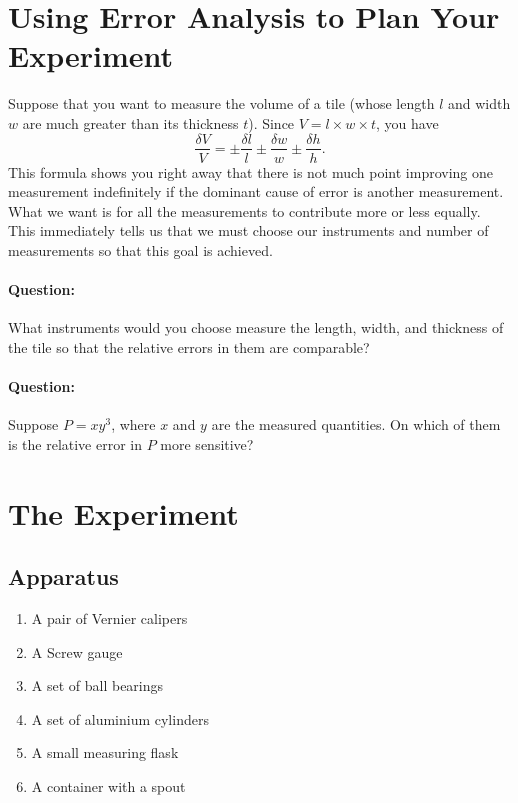 \section{Using Error Analysis to Plan Your Experiment}

Suppose that you want to measure the volume of a tile (whose length $l$ and width $w$ are much greater than its thickness $t$). Since $V = l \times w \times t$, you have
\begin{equation*}
    \frac{\delta V}{V} = \pm \frac{\delta l}{l} \pm \frac{\delta w}{w} \pm \frac{\delta h}{h}.
\end{equation*}
This formula shows you right away that there is not much point improving one measurement indefinitely if the dominant cause of error is another measurement. What we want is for all the measurements to contribute more or less equally. This immediately tells us that we must choose our instruments and number of measurements so that this goal is achieved. 

\begin{question}
\paragraph{Question:} What instruments would you choose measure the length, width, and thickness of the tile so that the relative errors in them are comparable?


\paragraph{Question:} Suppose $P = x y^3$, where $x$ and $y$ are the measured quantities. On which of them is the relative error in $P$ more sensitive?

\end{question}
\newpage
\section{The Experiment}

\subsection{Apparatus}

\begin{enumerate}
    \item A pair of Vernier calipers
    \item A Screw gauge
    \item A set of ball bearings
    \item A set of aluminium cylinders
    \item A small measuring flask
    \item A container with a spout
\end{enumerate}


